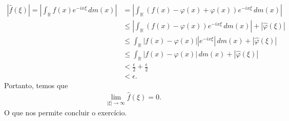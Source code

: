 \begin{homeworkProblem}[6]
\begin{solution}
    \begin{align*}
      |\hat{f}(\xi)|=\left| \int_{\mathbb{R}}f(x)e^{-ix\xi}\,dm(x) \right|&=\left| \int_{\mathbb{R}}(f(x)-\varphi(x)+\varphi(x))e^{-ix\xi}\,dm(x) \right|\\
      &\leq \left| \int_{\mathbb{R}}(f(x)-\varphi(x))e^{-ix\xi}\,dm(x) \right|+|\hat{\varphi}(\xi)|\\
      &\leq \int_{\mathbb{R}}\left| f(x)-\varphi(x) \right||e^{-ix\xi}|\,dm(x)+|\hat{\varphi}(\xi)|\\
      &\leq \int_{\mathbb{R}}|f(x)-\varphi(x)|\,dm(x)+|\hat{\varphi}(\xi)|\\
      &< \frac{\epsilon}{2}+\frac{\epsilon}{2}\\
      &< \epsilon. 
    \end{align*}
    Portanto, temos que
    \begin{align*}
      \lim_{|\xi| \to \infty}\hat{f}(\xi)=0.
    \end{align*}
    O que nos permite concluir o exercício.
  \end{solution}
\end{homeworkProblem}
